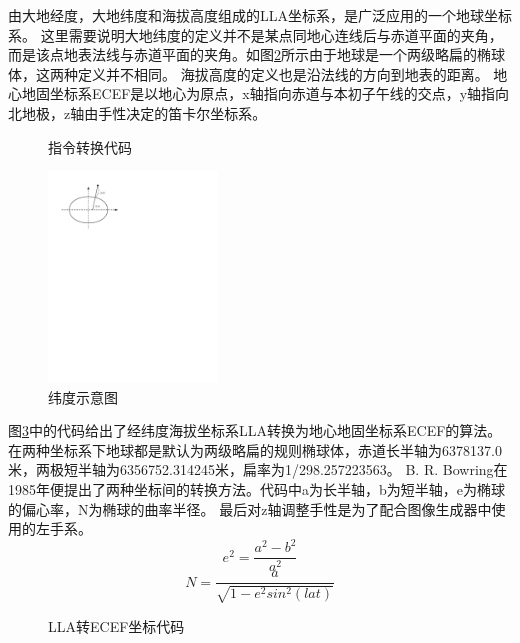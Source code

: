 \par
由大地经度，大地纬度和海拔高度组成的LLA坐标系，是广泛应用的一个地球坐标系。
这里需要说明大地纬度的定义并不是某点同地心连线后与赤道平面的夹角，而是该点地表法线与赤道平面的夹角。如图\ref{latitude}所示由于地球是一个两级略扁的椭球体，这两种定义并不相同。
海拔高度的定义也是沿法线的方向到地表的距离。
地心地固坐标系ECEF是以地心为原点，x轴指向赤道与本初子午线的交点，y轴指向北地极，z轴由手性决定的笛卡尔坐标系。
\clearpage
\begin{figure}[h!]
    \begin{center}
        
        \caption{指令转换代码}
        \label{21convert}
    \end{center}
\end{figure}
\begin{figure}[h!]
    \begin{center}
        \includegraphics[width=0.4\textwidth]{pictures/latitude.pdf}
        \caption{纬度示意图}
        \label{latitude}
    \end{center}
\end{figure}
\par
图\ref{LLA2ECEF}中的代码给出了经纬度海拔坐标系LLA转换为地心地固坐标系ECEF的算法。
在两种坐标系下地球都是默认为两级略扁的规则椭球体，赤道长半轴为6378137.0米，两极短半轴为6356752.314245米，扁率为1/298.257223563。
B. R. Bowring在1985年便提出了两种坐标间的转换方法\cite{cha4}。代码中a为长半轴，b为短半轴，e为椭球的偏心率，N为椭球的曲率半径。
最后对z轴调整手性是为了配合图像生成器中使用的左手系。
$$e^2=\frac{a^2-b^2}{a^2}$$
$$N=\frac{a}{\sqrt{1-e^2sin^2(lat)}}$$
\begin{figure}[h!]
    \begin{center}
        
        \caption{LLA转ECEF坐标代码}
        \label{LLA2ECEF}
    \end{center}
\end{figure}
